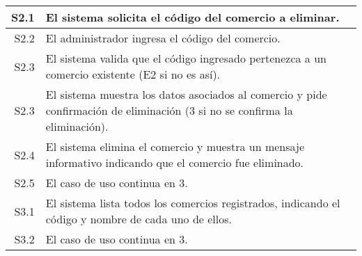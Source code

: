 \begin{tabularx}{\textwidth}{| r | X |}
\hline
S2.1 & El sistema solicita el código del comercio a eliminar. \\
\hline
S2.2 & El administrador ingresa el código del comercio. \\
\hline
S2.3 & El sistema valida que el código ingresado pertenezca a un comercio
existente (E2 si no es así). \\
\hline
S2.3 & El sistema muestra los datos asociados al comercio y pide confirmación
de eliminación (3 si no se confirma la eliminación). \\
\hline
S2.4 & El sistema elimina el comercio y muestra un mensaje informativo
indicando que el comercio fue eliminado. \\
\hline
S2.5 & El caso de uso continua en 3. \\

\hline
S3.1 & El sistema lista todos los comercios registrados, indicando el código y
nombre de cada uno de ellos. \\
\hline
S3.2 & El caso de uso continua en 3. \\

\hline
\end{tabularx}

